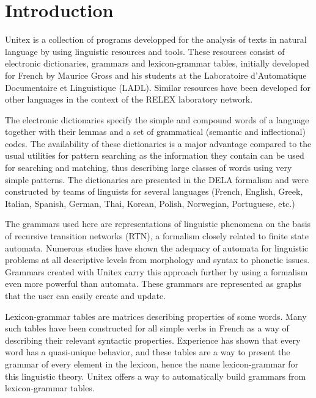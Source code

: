 \chapter*{Introduction}

Unitex is a collection of programs developped for the analysis of texts in
natural language by using linguistic resources and tools. These resources
consist of electronic dictionaries, grammars and lexicon-grammar tables,
initially developed  for French by Maurice Gross and his students  at the
Laboratoire d'Automatique Documentaire et Linguistique (LADL).
Similar resources have been developed for other languages in the context of the
RELEX laboratory network.

\bigskip
\noindent The electronic dictionaries specify the simple and compound words of a
language together with their lemmas and a set of grammatical (semantic and inflectional)
codes. The availability of these dictionaries is a major advantage compared to
the usual utilities for pattern searching as the information they contain can be
used  for searching and matching,  thus  describing large classes of words using
very simple patterns. The dictionaries are presented in the DELA formalism and
were constructed  by teams of  linguists for several languages (French, English,
Greek, Italian, Spanish, German, Thai, Korean, Polish, Norwegian, Portuguese,
etc.)

\bigskip
\noindent The grammars used here are representations of linguistic phenomena on the
basis of  recursive transition networks (RTN), a formalism closely related to
finite state automata. Numerous studies have shown the adequacy of automata for
linguistic problems at all descriptive levels  from morphology and syntax to
phonetic issues. Grammars created with Unitex carry this approach further  by
using a formalism even more powerful than automata. These grammars are
represented as graphs that the user can easily create and update.

\bigskip
\noindent Lexicon-grammar tables are matrices describing
properties of some words. Many such tables have been constructed   for all
simple verbs in French as a way of describing their relevant
syntactic properties. Experience has shown that every word has a
quasi-unique behavior, and these tables are a way to present the 
grammar of every element in the lexicon, hence the name lexicon-grammar 
for this linguistic theory. Unitex offers a way to
automatically build grammars from lexicon-grammar tables.

